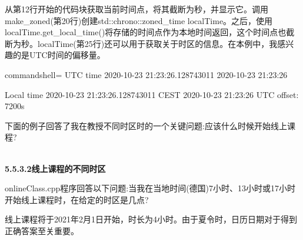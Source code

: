 从第12行开始的代码块获取当前时间点，将其截断为秒，并显示它。调用make\_zoned(第20行)创建std::chrono::zoned\_time localTime。之后，使用localTime.get\_local\_time()将存储的时间点作为本地时间返回，这个时间点也截断为秒。localTime(第25行)还可以用于获取关于时区的信息。在本例中，我感兴趣的是UTC时间的偏移量。

\begin{tcblisting}{commandshell={}}
UTC time
  2020-10-23 21:23:26.128743011
  2020-10-23 21:23:26
  
Local time
  2020-10-23 21:23:26.128743011 CEST
  2020-10-23 21:23:26
  UTC offset: 7200s
\end{tcblisting}

下面的例子回答了我在教授不同时区时的一个关键问题:应该什么时候开始线上课程?

\hspace*{\fill} \\ %
\noindent
\textbf{5.5.3.2\hspace{0.2cm}线上课程的不同时区}

onlineClass.cpp程序回答以下问题:当我在当地时间(德国)7小时、13小时或17小时开始线上课程时，在给定的时区是几点?

线上课程将于2021年2月1日开始，时长为4小时。由于夏令时，日历日期对于得到正确答案至关重要。

